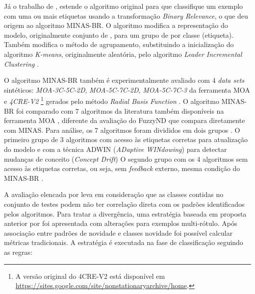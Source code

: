 Já o trabalho de , estende o algoritmo original para que
classifique um exemplo com uma ou mais etiquetas usando a transformação
\emph{Binary Relevance}, o que deu origem ao algoritmo MINAS-BR.
O algoritmo modifica a representação do modelo, originalmente conjunto de \clusters, para
um grupo de \clusters por classe (etiqueta).
Também modifica o método de agrupamento, substituindo a inicialização do 
algoritmo \emph{K-means}, originalmente aleatória, pelo algoritmo 
\emph{Leader Incremental Clustering} \cite{Vijaya2004505}.

O algoritmo MINAS-BR também é experimentalmente avaliado com 4 \emph{data sets}
sintéticos: \emph{MOA-3C-5C-2D}, \emph{MOA-5C-7C-2D}, \emph{MOA-5C-7C-3} da
ferramenta MOA \cite{MOA} e \emph{4CRE-V2}
\footnote{
    A versão original do \dataset 4CRE-V2 está disponível em
    \url{https://sites.google.com/site/nonstationaryarchive/home}.
}
gerados pelo método \emph{Radial Basis Function} \cite{souza2015,Costa2019}.
O algoritmo MINAS-BR foi comparado com 7 algoritmos da literatura também
disponíveis na ferramenta MOA \cite{MOA}, diferente da avaliação do FuzzyND que
compara diretamente com MINAS. Para análise, os 7 algoritmos foram divididos em
dois grupos \cite{Costa2019}.
O primeiro grupo de 3 algoritmos com acesso às etiquetas corretas para
atualização do modelo e com a técnica ADWIN (\emph{ADaptive WINdowing}) para detectar
mudanças de conceito (\emph{Concept Drift})
O segundo grupo com os 4 algoritmos sem acesso às etiquetas corretas,
ou seja, sem \emph{feedback} externo, mesma condição do MINAS-BR \cite{Costa2019}.

A avaliação elencada por  leva em consideração que as classes
contidas no conjunto de testes podem não ter correlação direta com os padrões identificados
pelos algoritmos.
Para tratar a divergência, uma estratégia baseada em proposta anterior por
 foi apresentada com alterações para exemplos multi-rótulo.
Após associação entre padrões de novidade e classes novidade foi possível calcular
métricas tradicionais.
A estratégia é executada na fase de classificação seguindo as regras:

